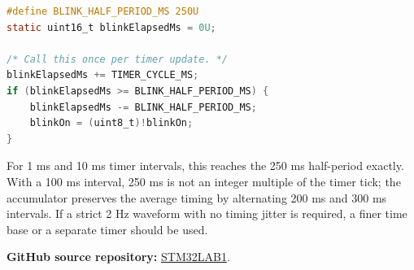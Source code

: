 \begin{lstlisting}[language=C, caption={Suggested elapsed-time accumulator for the blink half-period}, label={lst:exercise4_blink_fix}, captionpos=b]
#define BLINK_HALF_PERIOD_MS 250U
static uint16_t blinkElapsedMs = 0U;

/* Call this once per timer update. */
blinkElapsedMs += TIMER_CYCLE_MS;
if (blinkElapsedMs >= BLINK_HALF_PERIOD_MS) {
    blinkElapsedMs -= BLINK_HALF_PERIOD_MS;
    blinkOn = (uint8_t)!blinkOn;
}
\end{lstlisting}

For 1 ms and 10 ms timer intervals, this reaches the 250 ms half-period exactly. With a 100 ms interval, 250 ms is not an integer multiple of the timer tick; the accumulator preserves the average timing by alternating 200 ms and 300 ms intervals. If a strict 2 Hz waveform with no timing jitter is required, a finer time base or a separate timer should be used.

\vspace{0.15cm}
\noindent\textbf{GitHub source repository:} \href{https://github.com/haunguyen-2006/STM32LAB1}{STM32LAB1}.
